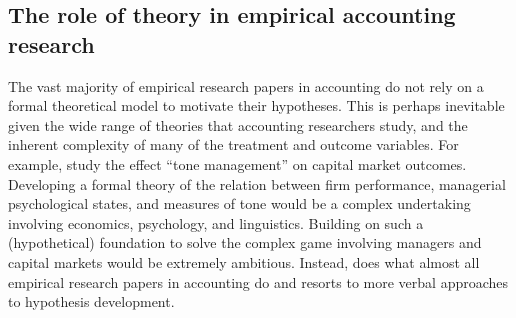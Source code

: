 \documentclass[11pt]{amsart}
\begin{document}
\subsection{The role of theory in empirical accounting research}
The vast majority of empirical research papers in accounting do not rely on a formal theoretical model to motivate their hypotheses.
This is perhaps inevitable given the wide range of theories that accounting researchers study, and the inherent complexity of many of the treatment and outcome variables.
For example, \citet{Huang:2014cs} study the effect ``tone management'' on capital market outcomes.
Developing a formal theory of the relation between firm performance, managerial psychological states, and measures of tone would be a complex undertaking involving economics, psychology, and linguistics.
Building on such a (hypothetical) foundation to solve the complex game involving managers and capital markets would be extremely ambitious.
Instead, \citet{Huang:2014cs} does what almost all empirical research papers in accounting do and resorts to more verbal approaches to hypothesis development. 





\clearpage


\end{document}
